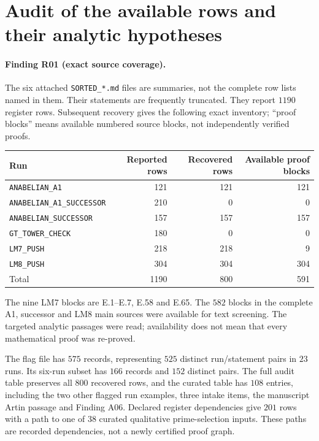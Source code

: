 \section{Audit of the available rows and their analytic hypotheses}
\label{sec:row-audit}

\paragraph{Finding R01 (exact source coverage).}
The six attached \texttt{SORTED\_*.md} files are summaries, not the
complete row lists named in them. Their statements are frequently
truncated. They report $1190$ register rows. Subsequent recovery gives
the following exact inventory; ``proof blocks'' means available numbered
source blocks, not independently verified proofs.
\begin{center}
\begin{tabular}{lrrr}
\hline
Run & Reported rows & Recovered rows & Available proof blocks\\
\hline
\texttt{ANABELIAN\_A1} &121&121&121\\
\texttt{ANABELIAN\_A1\_SUCCESSOR}&210&0&0\\
\texttt{ANABELIAN\_SUCCESSOR}&157&157&157\\
\texttt{GT\_TOWER\_CHECK}&180&0&0\\
\texttt{LM7\_PUSH}&218&218&9\\
\texttt{LM8\_PUSH}&304&304&304\\
\hline
Total&1190&800&591\\
\hline
\end{tabular}
\end{center}
The nine LM7 blocks are E.1--E.7, E.58 and E.65. The $582$ blocks in
the complete A1, successor and LM8 main sources were available for
text screening. The targeted analytic passages were read; availability
does not mean that every mathematical proof was re-proved.

The flag file has $575$ records, representing $525$ distinct run/statement
pairs in $23$ runs. Its six-run subset has $166$ records and $152$
distinct pairs. The full audit table preserves all $800$ recovered rows,
and the curated table has $108$ entries, including the two other flagged
run examples, three intake items, the manuscript Artin passage and
Finding A06. Declared register dependencies give $201$ rows with a path
to one of $38$ curated qualitative prime-selection inputs. These paths
are recorded dependencies, not a newly certified proof graph.

